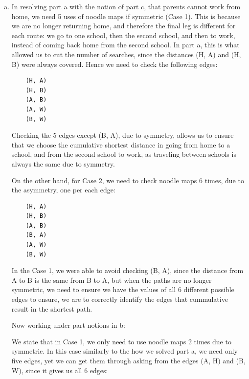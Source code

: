\documentclass[letterpaper,11pt]{article}
\theoremstyle{plain}
\theoremstyle{definition}
\begin{document}
{\begin{enumerate}[a)]
        \begin{verbatim}
        (H, A)
        (A, H)
        (A, B)
        (B, A)
        (H, B)
        (B, H)
        \end{verbatim}
        
        As previously stated, running noodle maps on \texttt{(H, A)} gives also \texttt{(H, B)}. Then, on \texttt{(A, B)} gives \texttt{(A, H)}, and on \texttt{(B, H)} gives \texttt{(B, A)}. Thus, after 3 uses of noodle maps we would get all 6 edges to be able to calculate the shortest path given each of their distances.
    \item
    
    
    In resolving part a with the notion of part c, that parents cannot work from home, we need 5 uses of noodle maps if symmetric (Case 1). This is because we are no longer returning home, and therefore the final leg is different for each route: we go to one school, then the second school, and then to work, instead of coming back home from the second school. In part a, this is what allowed us to cut the number of searches, since the distances (H, A) and (H, B) were always covered. Hence we need to check the following edges:
    
    \begin{verbatim}
    (H, A)
    (H, B)
    (A, B)
    (A, W)
    (B, W)
    \end{verbatim}

    Checking the 5 edges except (B, A), due to symmetry, allows us to ensure that we choose the cumulative shortest distance in going from home to a school, and from the second school to work, as traveling between schools is always the same due to symmetry.

    On the other hand, for Case 2, we need to check noodle maps 6 times, due to the asymmetry,  one per each edge:
    \begin{verbatim}
    (H, A)
    (H, B)
    (A, B)
    (B, A)
    (A, W)
    (B, W)
    \end{verbatim}

    In the Case 1, we were able to avoid checking (B, A), since the distance from A to B is the same from B to A, but when the paths are no longer symmetric, we need to ensure we have the values of all 6 different possible edges to ensure, we are to correctly identify the edges that cummulative result in the shortest path.
    
    Now working under part notions in b:
    
    We state that in Case 1, we only need to use noodle maps 2 times due to symmetric. In this case similarly to the how we solved part a, we need only five edges, yet we can get them through asking from the edges (A, H) and (B, W), since it gives us all 6 edges: 
    

\end{enumerate}}
\end{document}
